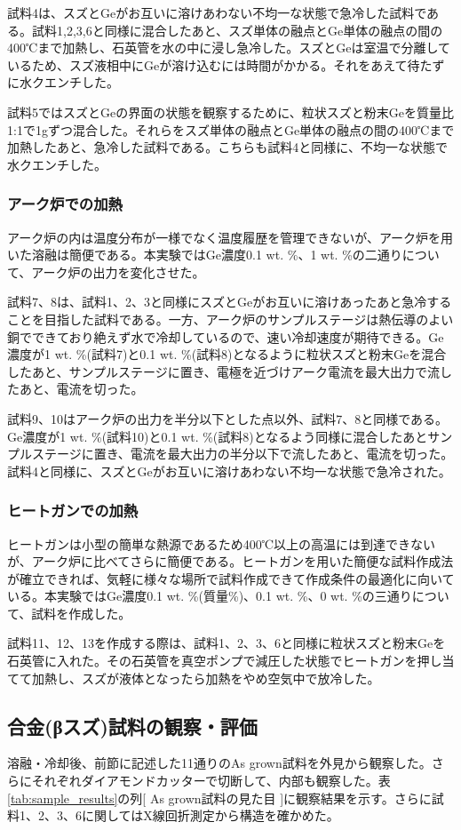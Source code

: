 試料4は、スズとGeがお互いに溶けあわない不均一な状態で急冷した試料である。試料1,2,3,6と同様に混合したあと、スズ単体の融点とGe単体の融点の間の400℃まで加熱し、石英管を水の中に浸し急冷した。スズとGeは室温で分離しているため、スズ液相中にGeが溶け込むには時間がかかる。それをあえて待たずに水クエンチした。

試料5ではスズとGeの界面の状態を観察するために、粒状スズと粉末Geを質量比1:1で1gずつ混合した。それらをスズ単体の融点とGe単体の融点の間の400℃まで加熱したあと、急冷した試料である。こちらも試料4と同様に、不均一な状態で水クエンチした。

\subsubsection{アーク炉での加熱}
アーク炉の内は温度分布が一様でなく温度履歴を管理できないが、アーク炉を用いた溶融は簡便である。本実験ではGe濃度0.1 wt. \%、1 wt. \%の二通りについて、アーク炉の出力を変化させた。

試料7、8は、試料1、2、3と同様にスズとGeがお互いに溶けあったあと急冷することを目指した試料である。一方、アーク炉のサンプルステージは熱伝導のよい銅でできており絶えず水で冷却しているので、速い冷却速度が期待できる。Ge濃度が1 wt. \%(試料7)と0.1 wt. \%(試料8)となるように粒状スズと粉末Geを混合したあと、サンプルステージに置き、電極を近づけアーク電流を最大出力で流したあと、電流を切った。

試料9、10はアーク炉の出力を半分以下とした点以外、試料7、8と同様である。Ge濃度が1 wt. \%(試料10)と0.1 wt. \%(試料8)となるよう同様に混合したあとサンプルステージに置き、電流を最大出力の半分以下で流したあと、電流を切った。試料4と同様に、スズとGeがお互いに溶けあわない不均一な状態で急冷された。

\subsubsection{ヒートガンでの加熱}
ヒートガンは小型の簡単な熱源であるため400℃以上の高温には到達できないが、アーク炉に比べてさらに簡便である。ヒートガンを用いた簡便な試料作成法が確立できれば、気軽に様々な場所で試料作成できて作成条件の最適化に向いている。本実験ではGe濃度0.1 wt. \%(質量\%)、0.1 wt. \%、0 wt. \%の三通りについて、試料を作成した。

試料11、12、13を作成する際は、試料1、2、3、6と同様に粒状スズと粉末Geを石英管に入れた。その石英管を真空ポンプで減圧した状態でヒートガンを押し当てて加熱し、スズが液体となったら加熱をやめ空気中で放冷した。

\subsection{合金(βスズ)試料の観察・評価}
溶融・冷却後、前節に記述した11通りのAs grown試料を外見から観察した。さらにそれぞれダイアモンドカッターで切断して、内部も観察した。表\ref{tab:sample_results}の列[ As grown試料の見た目 ]に観察結果を示す。さらに試料1、2、3、6に関してはX線回折測定から構造を確かめた。

